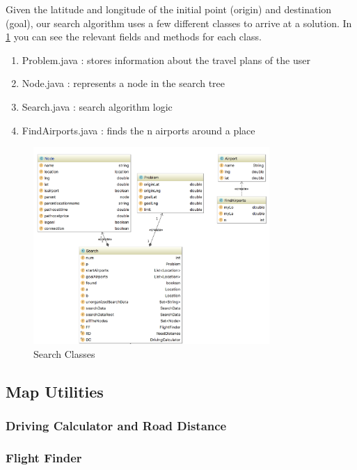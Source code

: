 \documentclass[11pt]{article}
\begin{document}
Given the latitude and longitude of the initial point (origin) and destination (goal), our search algorithm uses a few different classes to arrive at a solution.
In \ref{fig:suml} you can see the relevant fields and methods for each class.
\begin{enumerate}
\item Problem.java : stores information about the travel plans of the user 
\item Node.java : represents a node in the search tree
\item Search.java : search algorithm logic
\item FindAirports.java : finds the n airports around a place
\end{enumerate}

\begin{figure}[!ht]
  \centering
  \includegraphics[width=0.8\textwidth]{searchuml.png}
  \caption{Search Classes}
  \label{fig:suml}
\end{figure}

\pagebreak

\subsection{Map Utilities}

\subsubsection{Driving Calculator and Road Distance}

\subsubsection{Flight Finder}
\end{document}
